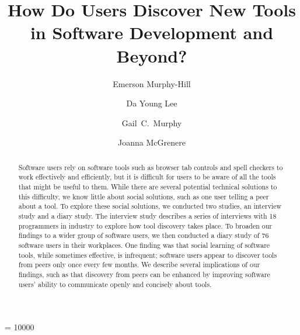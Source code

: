 \documentclass[smallextended]{svjour3}
\begin{document}
\widowpenalty = 10000


\title{How Do Users Discover New Tools\\in Software Development and Beyond?}

\author{Emerson Murphy-Hill         \and
        Da Young Lee \and
        Gail~C.~Murphy \and
        Joanna McGrenere
}



\maketitle

\begin{abstract}

Software users rely on software tools such as browser tab controls and spell checkers to work effectively 
and efficiently, but it is difficult for users to be aware of all the tools that might be useful to them. 
While there are several potential technical solutions to this difficulty, we know little about social solutions, such as one user telling a peer about a tool.
To explore these social solutions, we conducted two studies, an interview study and a diary study.
The interview study describes a series of interviews with 18 programmers in industry to explore how tool discovery takes place. 
To broaden our findings to a wider group of software users, 
we then conducted a diary study of 76 software users in their workplaces.
One finding was that social learning of software tools, while sometimes effective, is infrequent;
software users appear to discover 
tools from peers only once every few months.
We describe several implications of our findings, such as that discovery from peers can 
be enhanced by improving software users' ability to communicate openly and concisely about tools.


\end{abstract}
\end{document}
